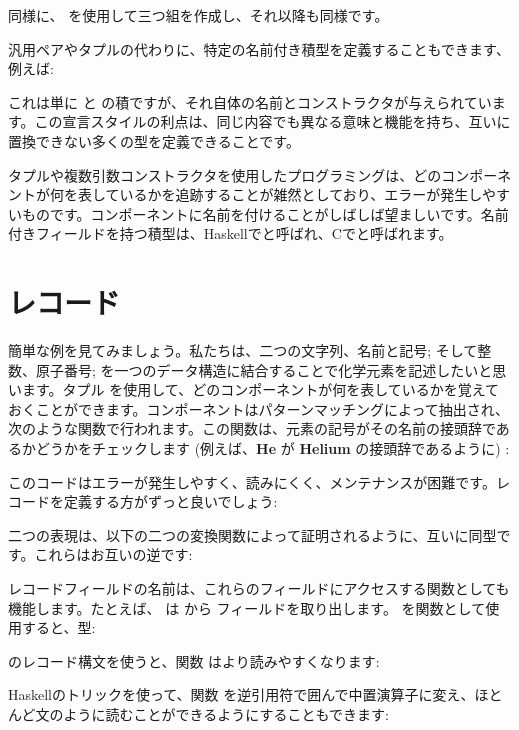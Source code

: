 同様に、\code{(,,)} を使用して三つ組を作成し、それ以降も同様です。

汎用ペアやタプルの代わりに、特定の名前付き積型を定義することもできます、例えば: 

これは単に  と  の積ですが、それ自体の名前とコンストラクタが与えられています。この宣言スタイルの利点は、同じ内容でも異なる意味と機能を持ち、互いに置換できない多くの型を定義できることです。

タプルや複数引数コンストラクタを使用したプログラミングは、どのコンポーネントが何を表しているかを追跡することが雑然としており、エラーが発生しやすいものです。コンポーネントに名前を付けることがしばしば望ましいです。名前付きフィールドを持つ積型は、Haskellでと呼ばれ、Cでと呼ばれます。

\section{レコード}

簡単な例を見てみましょう。私たちは、二つの文字列、名前と記号; そして整数、原子番号; を一つのデータ構造に結合することで化学元素を記述したいと思います。タプル  を使用して、どのコンポーネントが何を表しているかを覚えておくことができます。コンポーネントはパターンマッチングによって抽出され、次のような関数で行われます。この関数は、元素の記号がその名前の接頭辞であるかどうかをチェックします (例えば、\textbf{He} が \textbf{Helium} の接頭辞であるように) : 

このコードはエラーが発生しやすく、読みにくく、メンテナンスが困難です。レコードを定義する方がずっと良いでしょう: 

二つの表現は、以下の二つの変換関数によって証明されるように、互いに同型です。これらはお互いの逆です: 


レコードフィールドの名前は、これらのフィールドにアクセスする関数としても機能します。たとえば、 は  から  フィールドを取り出します。 を関数として使用すると、型: 

 のレコード構文を使うと、関数  はより読みやすくなります: 

Haskellのトリックを使って、関数  を逆引用符で囲んで中置演算子に変え、ほとんど文のように読むことができるようにすることもできます: 

